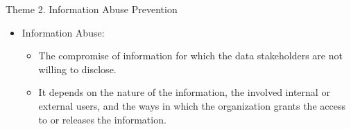 \documentclass[
 size=14pt,
 paper=smartboard,  %
 mode=present, 		%
 display=slides, 	%
 style=tuliplab,  	%
 pauseslide,
 fleqn,leqno]{powerdot}
\begin{document}
\begin{slide}{Theme 2. Information Abuse Prevention}
\begin{itemize}
\item
Information Abuse:


\begin{itemize}
\item
The compromise of information
for which the data stakeholders are not willing to disclose.


\item
It depends on the nature of the information,
the involved internal or external users,
and the ways in which the organization grants the access to
or releases the information.

\end{itemize}
\end{itemize}

\end{slide}


\end{document}
